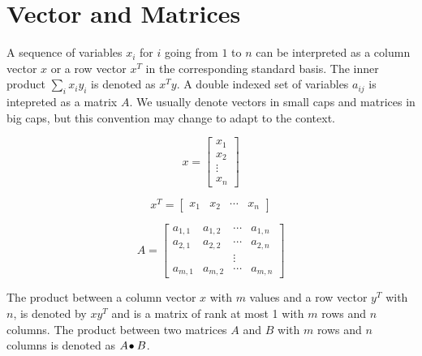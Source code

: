 \documentclass[a4paper,justified]{tufte-handout}
\begin{document}
 


\section{Vector and Matrices}

A sequence of variables $ x_{i} $ for $i$ going from $ 1$ to $n$ can
be interpreted as a column vector $ x $ or a row vector $ x^{T} $ in
the corresponding standard basis. The inner product $ \sum_{i} x_{i}
y_{i} $ is denoted as $ x^{T}y $.  A double indexed set of variables $
a_{ij} $ is intepreted as a matrix $ A $. We usually denote vectors in
small caps and matrices in big caps, but this convention may change to
adapt to the context.

\begin{figure*}\label{fig:arrayconvention}
\begin{minipage}[c]{0.20\textwidth}
\[
x=\begin{bmatrix}
  x_{1}\\
  x_{2}\\
  \vdots\\
  x_{n}
\end{bmatrix}
\]
\end{minipage}
\begin{minipage}[c]{0.40\textwidth}
\[
x^{T}=\begin{bmatrix}
  x_{1} & x_{2} & \cdots & x_{n} 
\end{bmatrix}
\]
\end{minipage}
\begin{minipage}[c]{0.40\textwidth}
\[
A=\begin{bmatrix}
  a_{1,1} & a_{1,2} & \cdots & a_{1,n} \\
  a_{2,1} & a_{2,2} & \cdots & a_{2,n} \\
  & & \vdots & \\
  a_{m,1} & a_{m,2} & \cdots & a_{m,n}
\end{bmatrix}
\]
\end{minipage}
\end{figure*}

The product between a column vector $ x $ with $ m $ values and a row
vector $ y^{T} $ with $ n $, is denoted by $ xy^{T} $ and is a matrix
of rank at most 1 with $ m $ rows and $ n $ columns. The product
between two matrices $ A $ and $ B $ with $ m $ rows and $ n $ columns
is denoted as ${A}\!\bullet{B}$.
\end{document}

